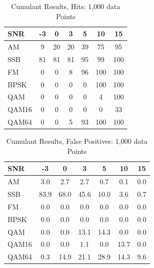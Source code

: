 \begin{table}
\caption{Cumulant Results, Hits: 1,000 data Points}
\centering
\begin{tabular}{ l | c | c | c | c | c | c } \hline
SNR   &	 -3 &	 0 &	 3 &	 5 &	 10 &	 15\\ \hline \hline 
AM    &	 9 &	 20 &	 20 &	 39 &	 75 &	 95 \\ \hline 
SSB   &	 81 &	 81 &	 81 &	 95 &	 99 &	 100 \\ \hline 
FM    &	 0 &	 0 &	 8 &	 96 &	 100 &	 100 \\ \hline 
BPSK  &	 0 &	 0 &	 0 &	 0 &	 100 &	 100 \\ \hline 
QAM   &	 0 &	 0 &	 0 &	 0 &	 4 &	 100 \\ \hline 
QAM16 &	 0 &	 0 &	 0 &	 0 &	 0 &	 33 \\ \hline 
QAM64 &	 0 &	 0 &	 5 &	 93 &	 100 &	 100 \\ \hline 
\end{tabular}
\label{tab:cumHit1000pt}
\end{table}

\begin{table}
\caption{Cumulant Results, False Positives: 1,000 data Points}
\centering
\begin{tabular}{ l | c | c | c | c | c | c } \hline
SNR   &	 -3 &	 0 &	 3 &	 5 &	 10 &	 15\\ \hline \hline 
AM &	 3.0 &	 2.7 &	 2.7 &	 0.7 &	 0.1 &	 0.0 \\ \hline 
SSB &	 83.9 &	 68.0 &	 45.6 &	 10.0 &	 3.6 &	 0.7 \\ \hline 
FM &	 0.0 &	 0.0 &	 0.0 &	 0.0 &	 0.0 &	 0.0  \\ \hline 
BPSK &	 0.0 &	 0.0 &	 0.0 &	 0.0 &	 0.0 &	 0.0 \\ \hline 
QAM &	 0.0 &	 0.0 &	 13.1 &	 14.3 &	 0.0 &	 0.0 \\ \hline 
QAM16 &	 0.0 &	 0.0 &	 1.1 &	 0.0 &	 13.7 &	 0.0 \\ \hline 
QAM64 &	 0.3 &	 14.9 &	 21.1 &	 28.9 &	 14.3 &	 9.6 \\ \hline
\end{tabular}
\label{tab:cumFalsePositive1000pt}
\end{table}

